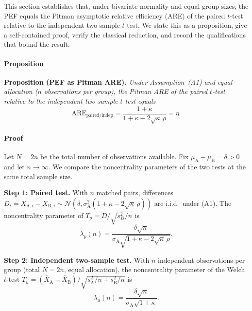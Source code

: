 This section establishes that, under bivariate normality and equal group sizes, the PEF equals the Pitman asymptotic relative efficiency (ARE) of the paired $t$-test relative to the independent two-sample $t$-test. We state this as a proposition, give a self-contained proof, verify the classical reduction, and record the qualifications that bound the result.

\paragraph*{Proposition}

\noindent\textbf{Proposition (PEF as Pitman ARE).} \emph{Under Assumption~(A1) and equal allocation ($n$ observations per group), the Pitman ARE of the paired $t$-test relative to the independent two-sample $t$-test equals}
\begin{equation}
  \mathrm{ARE}_{\mathrm{paired/indep}} = \frac{1+\kappa}{1+\kappa-2\sqrt{\kappa}\,\rho} = \eta.
  \label{eq:are_pef}
\end{equation}

\paragraph*{Proof}

Let $N=2n$ be the total number of observations available. Fix $\mu_{\mathrm{A}}-\mu_{\mathrm{B}}=\delta>0$ and let $n\to\infty$. We compare the noncentrality parameters of the two tests at the same total sample size.

\medskip
\noindent\textbf{Step 1: Paired test.} With $n$ matched pairs, differences $D_i=X_{\mathrm{A},i}-X_{\mathrm{B},i}\sim\mathcal{N}(\delta,\sigma^{2}_{\mathrm{A}}(1+\kappa-2\sqrt{\kappa}\,\rho))$ are i.i.d.\ under (A1). The noncentrality parameter of $T_p=\bar{D}/\sqrt{s^{2}_{D}/n}$ is
\begin{equation}
  \lambda_{p}(n) = \frac{\delta\sqrt{n}}{\sigma_{\mathrm{A}}\sqrt{1+\kappa-2\sqrt{\kappa}\,\rho}}.
  \label{eq:ncp_paired}
\end{equation}

\noindent\textbf{Step 2: Independent two-sample test.} With $n$ independent observations per group (total $N=2n$, equal allocation), the noncentrality parameter of the Welch $t$-test $T_u=(\bar{X}_{\mathrm{A}}-\bar{X}_{\mathrm{B}})/\sqrt{s^{2}_{\mathrm{A}}/n+s^{2}_{\mathrm{B}}/n}$ is
\begin{equation}
  \lambda_{u}(n) = \frac{\delta\sqrt{n}}{\sigma_{\mathrm{A}}\sqrt{1+\kappa}}.
  \label{eq:ncp_unpaired}
\end{equation}

